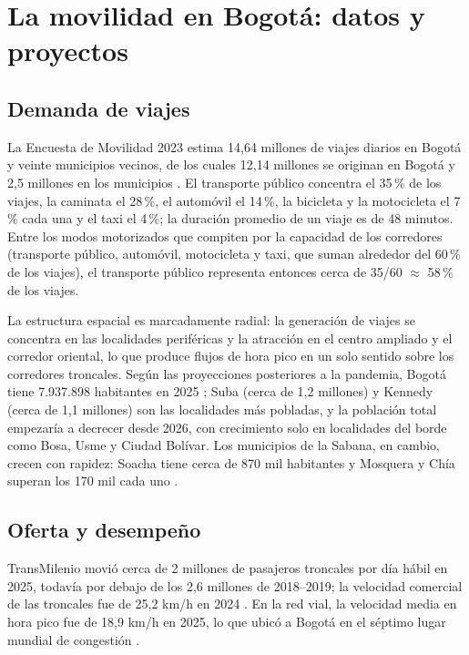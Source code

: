 \chapter{La movilidad en Bogotá: datos y proyectos}\label{cap:contexto}

\section{Demanda de viajes}

La Encuesta de Movilidad 2023 estima 14,64 millones de viajes diarios en Bogotá y veinte municipios
vecinos, de los cuales 12,14 millones se originan en Bogotá y 2,5 millones en los municipios
\citep{sdm2024}. El transporte público concentra el 35\,\% de los viajes, la caminata el 28\,\%, el
automóvil el 14\,\%, la bicicleta y la motocicleta el 7\,\% cada una y el taxi el 4\,\%; la duración
promedio de un viaje es de 48 minutos. Entre los modos motorizados que compiten por la capacidad de los
corredores (transporte público, automóvil, motocicleta y taxi, que suman alrededor del 60\,\% de los
viajes), el transporte público representa entonces cerca de 35/60 $\approx$ 58\,\% de los viajes.

La estructura espacial es marcadamente radial: la generación de viajes se concentra en las localidades
periféricas y la atracción en el centro ampliado y el corredor oriental, lo que produce flujos de hora
pico en un solo sentido sobre los corredores troncales. Según las proyecciones posteriores a la
pandemia, Bogotá tiene 7.937.898 habitantes en 2025 \citep{dane2025}; Suba (cerca de 1,2 millones) y
Kennedy (cerca de 1,1 millones) son las localidades más pobladas, y la población total empezaría a
decrecer desde 2026, con crecimiento solo en localidades del borde como Bosa, Usme y Ciudad Bolívar.
Los municipios de la Sabana, en cambio, crecen con rapidez: Soacha tiene cerca de 870 mil habitantes y
Mosquera y Chía superan los 170 mil cada uno \citep{dane2025}.

\section{Oferta y desempeño}

TransMilenio movió cerca de 2 millones de pasajeros troncales por día hábil en 2025, todavía por
debajo de los 2,6 millones de 2018--2019; la velocidad comercial de las troncales fue de 25,2 km/h en
2024 \citep{silla2026}. En la red vial, la velocidad media en hora pico fue de 18,9 km/h en 2025, lo que
ubicó a Bogotá en el séptimo lugar mundial de congestión \citep{tomtom2026}.

